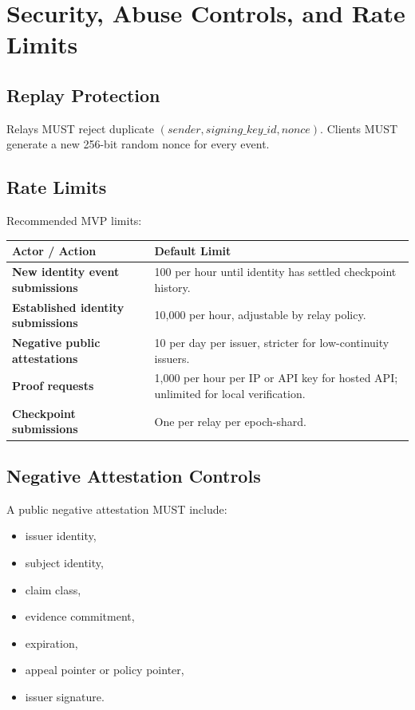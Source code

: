 \documentclass[11pt]{article}
\begin{document}
\section{Security, Abuse Controls, and Rate Limits}

\subsection{Replay Protection}

Relays MUST reject duplicate \((sender, signing\_key\_id, nonce)\). Clients MUST generate a new 256-bit random nonce for every event.

\subsection{Rate Limits}

Recommended MVP limits:

\begin{center}
\begin{tabularx}{\textwidth}{>{\bfseries}p{} X}
\toprule
Actor / Action & Default Limit \\
\midrule
New identity event submissions & 100 per hour until identity has settled checkpoint history. \\
Established identity submissions & 10,000 per hour, adjustable by relay policy. \\
Negative public attestations & 10 per day per issuer, stricter for low-continuity issuers. \\
Proof requests & 1,000 per hour per IP or API key for hosted API; unlimited for local verification. \\
Checkpoint submissions & One per relay per epoch-shard. \\
\bottomrule
\end{tabularx}
\end{center}

\subsection{Negative Attestation Controls}

A public negative attestation MUST include:

\begin{itemize}
    \item issuer identity,
    \item subject identity,
    \item claim class,
    \item evidence commitment,
    \item expiration,
    \item appeal pointer or policy pointer,
    \item issuer signature.
\end{itemize}
\end{document}
